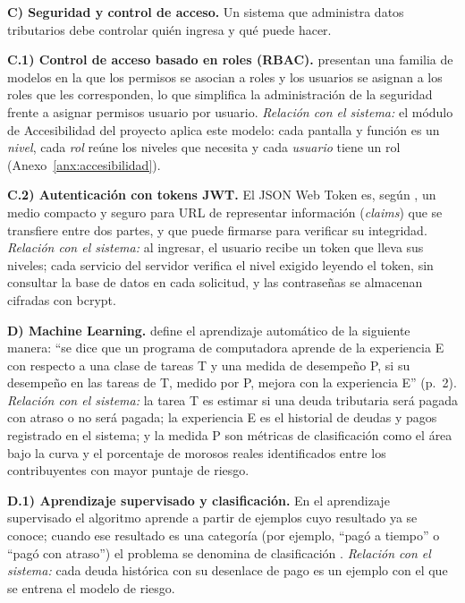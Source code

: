 \documentclass[12pt,a4paper]{report}
\begin{document}
\noindent\textbf{C) Seguridad y control de acceso.} Un sistema que administra datos tributarios debe controlar quién ingresa y qué puede hacer.

\noindent\textbf{C.1) Control de acceso basado en roles (RBAC).} \textcite{sandhu1996} presentan una familia de modelos en la que los permisos se asocian a roles y los usuarios se asignan a los roles que les corresponden, lo que simplifica la administración de la seguridad frente a asignar permisos usuario por usuario. \textit{Relación con el sistema:} el módulo de Accesibilidad del proyecto aplica este modelo: cada pantalla y función es un \textit{nivel}, cada \textit{rol} reúne los niveles que necesita y cada \textit{usuario} tiene un rol (Anexo~\ref{anx:accesibilidad}).

\noindent\textbf{C.2) Autenticación con tokens JWT.} El JSON Web Token es, según \textcite{rfc7519}, un medio compacto y seguro para URL de representar información (\textit{claims}) que se transfiere entre dos partes, y que puede firmarse para verificar su integridad. \textit{Relación con el sistema:} al ingresar, el usuario recibe un token que lleva sus niveles; cada servicio del servidor verifica el nivel exigido leyendo el token, sin consultar la base de datos en cada solicitud, y las contraseñas se almacenan cifradas con bcrypt.

\noindent\textbf{D) Machine Learning.} \textcite{mitchell1997} define el aprendizaje automático de la siguiente manera: ``se dice que un programa de computadora aprende de la experiencia E con respecto a una clase de tareas T y una medida de desempeño P, si su desempeño en las tareas de T, medido por P, mejora con la experiencia E'' (p.~2). \textit{Relación con el sistema:} la tarea T es estimar si una deuda tributaria será pagada con atraso o no será pagada; la experiencia E es el historial de deudas y pagos registrado en el sistema; y la medida P son métricas de clasificación como el área bajo la curva y el porcentaje de morosos reales identificados entre los contribuyentes con mayor puntaje de riesgo.

\noindent\textbf{D.1) Aprendizaje supervisado y clasificación.} En el aprendizaje supervisado el algoritmo aprende a partir de ejemplos cuyo resultado ya se conoce; cuando ese resultado es una categoría (por ejemplo, ``pagó a tiempo'' o ``pagó con atraso'') el problema se denomina de clasificación \parencite{mitchell1997}. \textit{Relación con el sistema:} cada deuda histórica con su desenlace de pago es un ejemplo con el que se entrena el modelo de riesgo.
\end{document}
